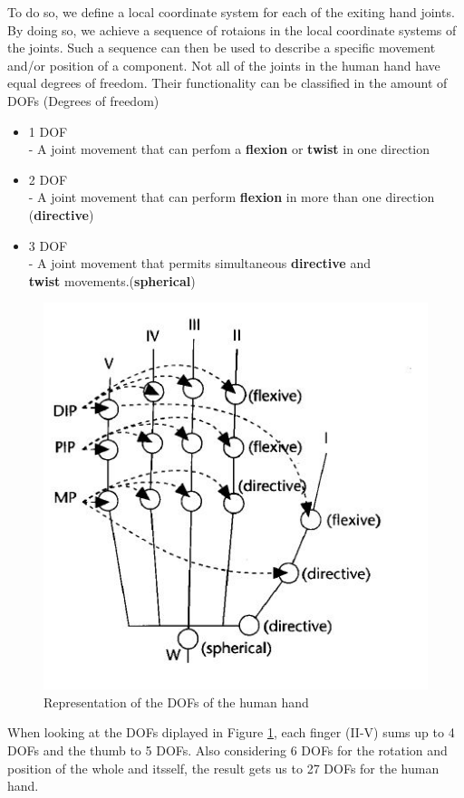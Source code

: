 To do so, we define a local coordinate system for each of the exiting hand joints. By doing so, we achieve a sequence of rotaions in the local coordinate systems of the joints. Such a sequence can then be used to describe a specific movement and/or position of a component.
Not all of the joints in the human hand have equal degrees of freedom. Their functionality can be classified in the amount of DOFs (Degrees of freedom)\cite{KOREIN.1985}
\begin{itemize}
\item 1 DOF \\
- A joint movement that can perfom a \textbf{flexion} or \textbf{twist} in one direction
\item 2 DOF \\
- A joint movement that can perform \textbf{flexion} in more than one direction\\ (\textbf{directive})
\item 3 DOF\\
- A joint movement that permits simultaneous \textbf{directive} and \\ \textbf{twist} movements.(\textbf{spherical})
\end{itemize}
\begin{figure}[H]
\includegraphics[scale=0.8]{images/Hand_DOFs.JPG} 
\caption{Representation of the DOFs of the human hand}
\label{dof_image} 
\end{figure}
When looking at the DOFs diplayed in Figure \ref{dof_image}, each finger (II-V) sums up to 4 DOFs and the thumb to 5 DOFs. Also considering 6 DOFs for the rotation and position of the whole and itsself, the result gets us to 27 DOFs  for the human hand.
